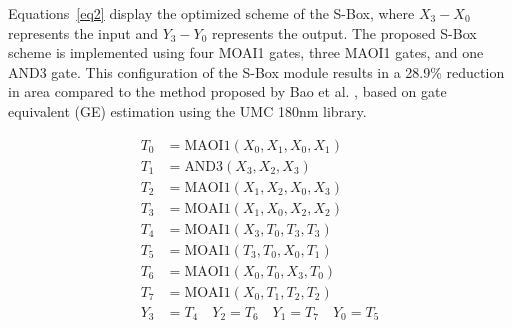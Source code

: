 \documentclass[final,5p,times,twocolumn]{elsarticle}
\begin{document}
Equations~\ref{eq2} display the optimized scheme of the S-Box, where $X_3-X_0$ represents the input and $Y_3-Y_0$ represents the output.
The proposed S-Box scheme is implemented using four MOAI1 gates, three MAOI1 gates, and one AND3 gate.
This configuration of the S-Box module results in a 28.9\% reduction in area compared to the method proposed by Bao et al. \cite{bao2019peigen}, based on gate equivalent (GE) estimation using the UMC 180nm library.

\begin{align}
    T_0 & = \text{MAOI1}(X_0, X_1, X_0, X_1) \nonumber            \\
    T_1 & = \text{AND3}(X_3, X_2, X_3) \nonumber                  \\
    T_2 & = \text{MAOI1}(X_1, X_2, X_0, X_3) \nonumber            \\
    T_3 & = \text{MOAI1}(X_1, X_0, X_2, X_2) \nonumber            \\
    T_4 & = \text{MOAI1}(X_3, T_0, T_3, T_3) \label{eq2}          \\
    T_5 & = \text{MOAI1}(T_3, T_0, X_0, T_1) \nonumber            \\
    T_6 & = \text{MAOI1}(X_0, T_0, X_3, T_0) \nonumber            \\
    T_7 & = \text{MOAI1}(X_0, T_1, T_2, T_2) \nonumber            \\
    Y_3 & = T_4 \quad Y_2 = T_6 \quad Y_1 = T_7 \quad  Y_0  = T_5
    \nonumber
\end{align}
\end{document}
